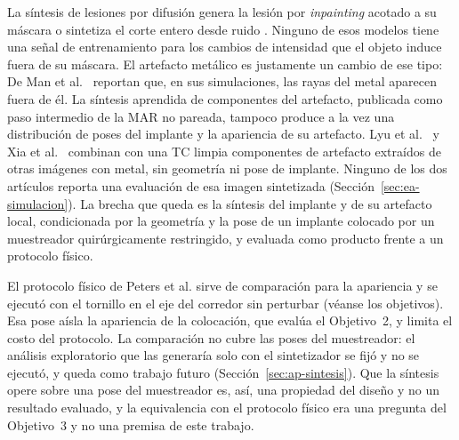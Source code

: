 La síntesis de lesiones por difusión genera la lesión por \emph{inpainting} acotado a su máscara \cite{ramzan2026claim,chen2024tumorsynthesis,jacob2026lgesynthnet} o sintetiza el corte entero desde ruido \cite{zhang2025diffboost}. Ninguno de esos modelos tiene una señal de entrenamiento para los cambios de intensidad que el objeto induce fuera de su máscara. El artefacto metálico es justamente un cambio de ese tipo: De Man et al.~\cite{deman1999} reportan que, en sus simulaciones, las rayas del metal aparecen fuera de él. La síntesis aprendida de componentes del artefacto, publicada como paso intermedio de la MAR no pareada, tampoco produce a la vez una distribución de poses del implante y la apariencia de su artefacto. Lyu et al.~\cite{lyu2021ududonet} y Xia et al.~\cite{xia2024pndnet} combinan con una TC limpia componentes de artefacto extraídos de otras imágenes con metal, sin geometría ni pose de implante. Ninguno de los dos artículos reporta una evaluación de esa imagen sintetizada (Sección~\ref{sec:ea-simulacion}). La brecha que queda es la síntesis del implante y de su artefacto local, condicionada por la geometría y la pose de un implante colocado por un muestreador quirúrgicamente restringido, y evaluada como producto frente a un protocolo físico.

El protocolo físico de Peters et al. sirve de comparación para la apariencia y se ejecutó con el tornillo en el eje del corredor sin perturbar (véanse los objetivos). Esa pose aísla la apariencia de la colocación, que evalúa el Objetivo~2, y limita el costo del protocolo. La comparación no cubre las poses del muestreador: el análisis exploratorio que las generaría solo con el sintetizador se fijó y no se ejecutó, y queda como trabajo futuro (Sección~\ref{sec:ap-sintesis}). Que la síntesis opere sobre una pose del muestreador es, así, una propiedad del diseño y no un resultado evaluado, y la equivalencia con el protocolo físico era una pregunta del Objetivo~3 y no una premisa de este trabajo.

